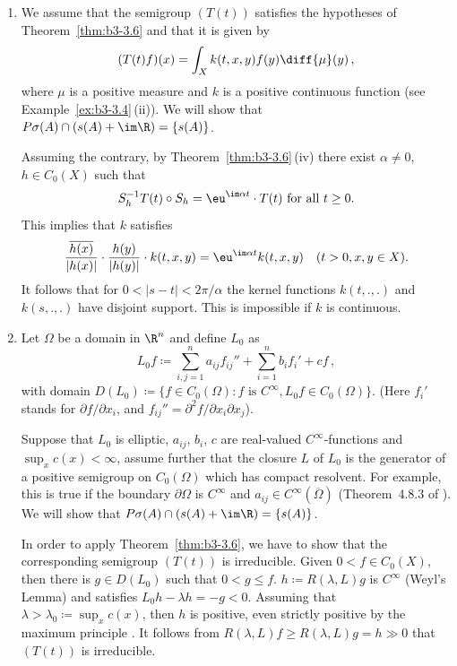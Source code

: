 \begin{examples}\label{ex:b3-3.10}
%
	
	\begin{enumerate}[\upshape (i), wide, labelindent=.25em] 
	\item 
	We assume that the semigroup $(T(t))$ satisfies the hypotheses of Theorem~\ref{thm:b3-3.6} and that it is given by
	\[
	(T(t)f)(x) = \int_{X} k(t,x,y)f(y) \diff{\mu}(y)\,,
	\]
	where $\mu$ is a positive measure and $k$ is a positive continuous function (see Example~\ref{ex:b3-3.4}\,(ii)).
	We will show that $P\sigma(A)\cap(s(A) + \im\R) = \{s(A)\}$.
	
	Assuming the contrary, by Theorem~\ref{thm:b3-3.6}\,(iv) there exist $\alpha \neq 0$, $h \in C_{0}(X)$ such that
	\begin{equation}\label{eq:b3-3.10}
	S_{h}^{-1}T(t)\circ S_{h} = \eu^{\im\alpha t}\cdot T(t) \text{ for all } t \geq 0.
	\end{equation}
	This implies that $k$ satisfies
	\begin{equation}\label{eq:b3-3.11}
	\frac{\overline{h(x)}}{|h(x)|}\cdot\frac{h(y)}{|h(y)|}\cdot k(t,x,y) = \eu^{\im\alpha t}k(t,x,y) \quad (t > 0, x,y \in X).
	\end{equation}
	It follows that for $0 < |s-t| < 2\pi/\alpha$ the kernel functions  $k(t,.,.)$ and $k(s,.,.)$ have disjoint support.
	This is impossible if\/ $k$ is continuous.
	
	\item 
	Let $\Omega$ be a domain in $\R^{n}$ and define $L_{0}$ as
	\[
	L_{0}f \coloneq \sum_{i,j=1}^{n} a_{ij}f_{ij}'' + \sum_{i=1}^{n}b_{i}f_{i}' + cf\,,
	\]
	with domain $D(L_{0}) \coloneq \{f \in C_{0}(\Omega) \colon f \text{ is } C^{\infty}, L_{0}f \in C_{0}(\Omega)\}$.
	(Here $f_{i}'$ stands for $\partial f/\partial x_{i}$, and $f_{ij}'' = \partial^{2}f/\partial x_{i}\partial x_{j}$).
	
	Suppose that $L_{0}$ is elliptic, $a_{ij}$, $b_{i}$, $c$ are real-valued $C^{\infty}$-functions and $\sup_x c(x) < \infty$, assume further that the closure $L$ of\/ $L_{0}$ is the generator of a positive semigroup on $C_{0}(\Omega)$ which has compact resolvent.
	For example, this is true if the boundary  $\partial\Omega$ is $C^{\infty}$ and $a_{ij} \in C^{\infty}(\overline{\Omega})$ (\cf Theorem~4.8.3 of \textcite{fattorini:1983}).
	We will show that $P\sigma(A)\cap(s(A) + \im\R) = \{s(A)\}$.
	
	In order to apply Theorem~\ref{thm:b3-3.6}, we have to show that the corresponding semigroup $(T(t))$ is irreducible.
	Given $0 < f \in C_{0}(X)$, then there is $g \in D(L_{0})$ such that $0 < g \leq f$.
	$h \coloneq R(\lambda,L)g$ is $C^{\infty}$ (Weyl's Lemma) and satisfies $L_{0}h - \lambda h = -g < 0$.
	Assuming that $\lambda > \lambda_{0} \coloneqq \sup_x c(x)$, then $h$ is positive, even strictly positive by the maximum principle \textcite[Chapter~2, Theorem~6]{protterweinberger:1967}.
	It follows from $R(\lambda,L)f \geq R(\lambda,L)g = h \gg 0$ that $(T(t))$ is irreducible.


\end{enumerate}
\end{examples}
